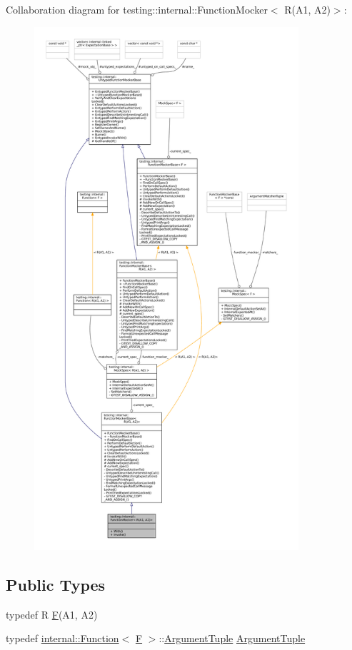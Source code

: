 Collaboration diagram for testing\+:\+:internal\+:\+:Function\+Mocker$<$ R(A1, A2)$>$\+:
\nopagebreak
\begin{figure}[H]
\begin{center}
\leavevmode
\includegraphics[height=550pt]{classtesting_1_1internal_1_1FunctionMocker_3_01R_07A1_00_01A2_08_4__coll__graph}
\end{center}
\end{figure}
\subsection*{Public Types}
\begin{DoxyCompactItemize}
\item 
typedef R \hyperlink{classtesting_1_1internal_1_1FunctionMocker_3_01R_07A1_00_01A2_08_4_a61302610bfc9b30588ea345e468310b2}{F}(A1, A2)
\item 
typedef \hyperlink{structtesting_1_1internal_1_1Function}{internal\+::\+Function}$<$ \hyperlink{classtesting_1_1internal_1_1FunctionMocker_3_01R_07A1_00_01A2_08_4_a61302610bfc9b30588ea345e468310b2}{F} $>$\+::\hyperlink{classtesting_1_1internal_1_1FunctionMocker_3_01R_07A1_00_01A2_08_4_ae75e3ba40a99224f7363681914212c19}{Argument\+Tuple} \hyperlink{classtesting_1_1internal_1_1FunctionMocker_3_01R_07A1_00_01A2_08_4_ae75e3ba40a99224f7363681914212c19}{Argument\+Tuple}
\end{DoxyCompactItemize}

